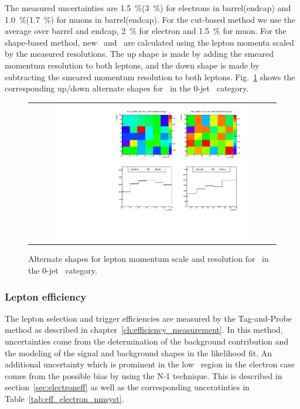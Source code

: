 The measured uncertainties are 1.5~\%(3~\%) for electrons in barrel(endcap)  
and 1.0~\%(1.7~\%) for muons in barrel(endcap). For the cut-based method 
we use the average over barrel and endcap, 2~\% for electron and 1.5~\% for muon. 
For the shape-based method, new \mT\ and \mll\ are calculated using the 
lepton momenta scaled by the measured resolutions.
The up shape is made by adding the smeared momentum resolution to both leptons,
and the down shape is made by subtracting the smeared momentum resolution to both leptons.
Fig.~\ref{fig:alter_lepres} shows the corresponding up/down alternate shapes 
for \qqww\ in the 0-jet \DF\ category. 
%
\begin{figure}[htp]
\centering
\begin{tabular}{c}
\includegraphics[width=0.8\textwidth]{figures/histo_qqWW_CMS_hww_MVALepResBounding_0j_zoom.pdf}
\end{tabular}
\caption{Alternate shapes for lepton momentum scale and resolution for \qqww\ in the 0-jet \DF\ category.}
\label{fig:alter_lepres}
\end{figure}


\subsubsection{Lepton efficiency} 

The lepton selection and trigger efficiencies are measured by the Tag-and-Probe method
as described in chapter~\ref{ch:efficiency_measurement}. In this method, uncertainties come from 
the determination of the background contribution and the modeling of the signal 
and background shapes in the likelihood fit. An additional uncertainty which is 
prominent in the low \pt\ region in the electron case 
comes from the possible bias by using the N-1 technique. 
This is described in section~\ref{sec:electroneff} as well as the corresponding 
unceratinties in Table~\ref{tab:eff_electron_nmsyst}.


